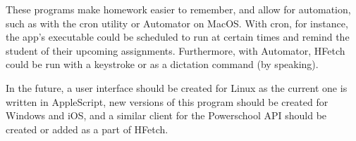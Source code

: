 These programs make homework easier to remember,
	and allow for automation, such as with the cron utility\cite{cron} or Automator\cite{automator} on MacOS.
With cron, for instance, the app's executable could be scheduled to run at certain times and remind the student of their upcoming assignments.
Furthermore, with Automator, HFetch could be run with a keystroke or as a dictation command (by speaking).

In the future, a user interface should be created for Linux as the current one is written in AppleScript,
	new versions of this program should be created for Windows and iOS,
	and a similar client for the Powerschool API should be created or added as a part of HFetch.